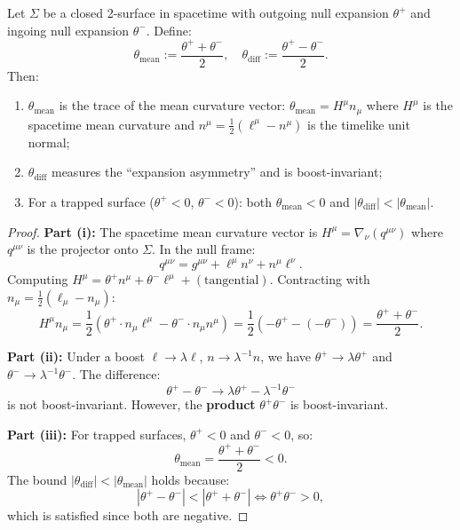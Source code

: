 \begin{theorem}
\label{thm:area-expansion-duality}
Let $\Sigma$ be a closed 2-surface in spacetime with outgoing null expansion $\theta^+$ and ingoing null expansion $\theta^-$. Define:
\begin{equation}
\theta_{\text{mean}} := \frac{\theta^+ + \theta^-}{2}, \quad \theta_{\text{diff}} := \frac{\theta^+ - \theta^-}{2}.
\end{equation}
Then:
\begin{enumerate}[label=(\roman*)]
\item $\theta_{\text{mean}}$ is the trace of the mean curvature vector: $\theta_{\text{mean}} = H^\mu n_\mu$ where $H^\mu$ is the spacetime mean curvature and $n^\mu = \frac{1}{2}(\ell^\mu - n^\mu)$ is the timelike unit normal;
\item $\theta_{\text{diff}}$ measures the ``expansion asymmetry'' and is boost-invariant;
\item For a trapped surface ($\theta^+ < 0$, $\theta^- < 0$): both $\theta_{\text{mean}} < 0$ and $|\theta_{\text{diff}}| < |\theta_{\text{mean}}|$.
\end{enumerate}
\end{theorem}

\begin{proof}
\textbf{Part (i):} The spacetime mean curvature vector is $H^\mu = \nabla_\nu (q^{\mu\nu})$ where $q^{\mu\nu}$ is the projector onto $\Sigma$. In the null frame:
\begin{equation}
q^{\mu\nu} = g^{\mu\nu} + \ell^\mu n^\nu + n^\mu \ell^\nu.
\end{equation}
Computing $H^\mu = \theta^+ n^\mu + \theta^- \ell^\mu + (\text{tangential})$. Contracting with $n_\mu = \frac{1}{2}(\ell_\mu - n_\mu)$:
\begin{equation}
H^\mu n_\mu = \frac{1}{2}(\theta^+ \cdot n_\mu \ell^\mu - \theta^- \cdot n_\mu n^\mu) = \frac{1}{2}(-\theta^+ - (-\theta^-)) = \frac{\theta^+ + \theta^-}{2}.
\end{equation}

\textbf{Part (ii):} Under a boost $\ell \to \lambda\ell$, $n \to \lambda^{-1}n$, we have $\theta^+ \to \lambda\theta^+$ and $\theta^- \to \lambda^{-1}\theta^-$. The difference:
\begin{equation}
\theta^+ - \theta^- \to \lambda\theta^+ - \lambda^{-1}\theta^-
\end{equation}
is not boost-invariant. However, the \textbf{product} $\theta^+\theta^-$ is boost-invariant.

\textbf{Part (iii):} For trapped surfaces, $\theta^+ < 0$ and $\theta^- < 0$, so:
\begin{equation}
\theta_{\text{mean}} = \frac{\theta^+ + \theta^-}{2} < 0.
\end{equation}
The bound $|\theta_{\text{diff}}| < |\theta_{\text{mean}}|$ holds because:
\begin{equation}
|\theta^+ - \theta^-| < |\theta^+ + \theta^-| \iff \theta^+\theta^- > 0,
\end{equation}
which is satisfied since both are negative.
\end{proof}

